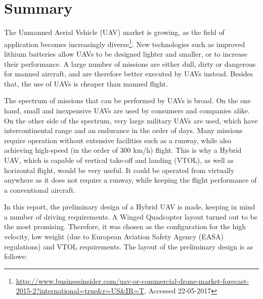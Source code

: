 \chapter*{Summary} %
\setlength{\parindent}{15pt}
\label{ch:summ}

The Unmanned Aerial Vehicle (UAV) market is growing, as the field of application becomes increasingly diverse\footnote{\url{http://www.businessinsider.com/uav-or-commercial-drone-market-forecast-2015-2?international=true&r=US&IR=T}, Accessed 22-05-2017}. New technologies such as improved lithium batteries allow UAVs to be designed lighter and smaller, or to increase their performance. A large number of missions are either dull, dirty or dangerous for manned aircraft, and are therefore better executed by UAVs instead. Besides that, the use of UAVs is cheaper than manned flight.

The spectrum of missions that can be performed by UAVs is broad. On the one hand, small and inexpensive UAVs are used by consumers and companies alike. On the other side of the spectrum, very large military UAVs are used, which have intercontinental range and an endurance in the order of days. Many missions require operation without extensive facilities such as a runway, while also achieving high-speed (in the order of 300 km/h) flight. This is why a Hybrid UAV, which is capable of vertical take-off and landing (VTOL), as well as horizontal flight, would be very useful. It could be operated from virtually anywhere as it does not require a runway, while keeping the flight performance of a conventional aircraft.



In this report, the preliminary design of a Hybrid UAV is made, keeping in mind a number of driving requirements. A Winged Quadcopter layout turned out to be the most promising. Therefore, it was chosen as the configuration for the high velocity, low weight (due to European Aviation Safety Agency (EASA) regulations) and VTOL requirements. The layout of the preliminary design is as follows: 







